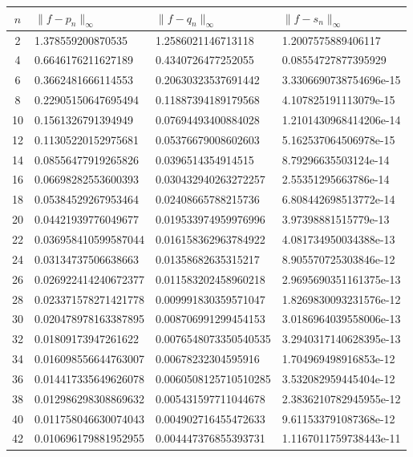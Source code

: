 \documentclass[11pt]{article}
\begin{document}
\newpage
\begin{tabular}{| c | l | l | l | }
\hline
$n$ & $\|f-p_n\|_\infty$ & $\|f-q_n\|_\infty$ & $\|f-s_n\|_\infty$ \\ \hline
2 & 1.378559200870535 & 1.2586021146713118 & 1.2007575889406117 \\ 
4 & 0.6646176211627189 & 0.4340726477252055 & 0.08554727877395929 \\ 
6 & 0.3662481666114553 & 0.20630323537691442 & 3.3306690738754696e-15 \\ 
8 & 0.22905150647695494 & 0.11887394189179568 & 4.107825191113079e-15 \\ 
10 & 0.1561326791394949 & 0.07694493400884028 & 1.2101430968414206e-14 \\ 
12 & 0.11305220152975681 & 0.05376679008602603 & 5.162537064506978e-15 \\ 
14 & 0.08556477919265826 & 0.0396514354914515 & 8.79296635503124e-14 \\ 
16 & 0.06698282553600393 & 0.030432940263272257 & 2.55351295663786e-14 \\ 
18 & 0.05384529267953464 & 0.02408665788215736 & 6.808442698513772e-14 \\ 
20 & 0.04421939776049677 & 0.019533974959976996 & 3.97398881515779e-13 \\ 
22 & 0.036958410599587044 & 0.016158362963784922 & 4.081734950034388e-13 \\ 
24 & 0.03134737506638663 & 0.01358682635315217 & 8.905570725303846e-12 \\ 
26 & 0.026922414240672377 & 0.011583202458960218 & 2.9695690351161375e-13 \\ 
28 & 0.023371578271421778 & 0.009991830359571047 & 1.8269830093231576e-12 \\ 
30 & 0.020478978163387895 & 0.008706991299454153 & 3.0186964039558006e-13 \\ 
32 & 0.01809173947261622 & 0.0076548073350540535 & 3.2940317140628395e-13 \\ 
34 & 0.016098556644763007 & 0.00678232304595916 & 1.704969498916853e-12 \\ 
36 & 0.014417335649626078 & 0.0060508125710510285 & 3.532082959445404e-12 \\ 
38 & 0.012986298308869632 & 0.005431597711044678 & 2.3836210782945955e-12 \\ 
40 & 0.011758046630074043 & 0.004902716455472633 & 9.611533791087368e-12 \\ 
42 & 0.010696179881952955 & 0.004447376855393731 & 1.1167011759738443e-11 \\ 

\end{tabular}
\end{document}
